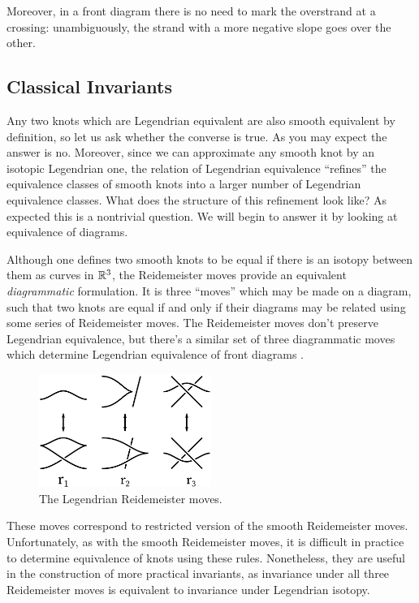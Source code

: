 Moreover, in a front diagram there is no need to mark the overstrand at a crossing: unambiguously, the strand with a more negative slope goes over the other.

\subsection{Classical Invariants}

Any two knots which are Legendrian equivalent are also smooth equivalent by definition, so let us ask whether the converse is true.
As you may expect the answer is no. Moreover, since we can approximate any smooth knot by an isotopic Legendrian one, the relation of Legendrian equivalence ``refines'' the equivalence classes of smooth knots into a larger number of Legendrian equivalence classes. What does the structure of this refinement look like? As expected this is a nontrivial question. We will begin to answer it by looking at equivalence of diagrams.

Although one defines two smooth knots to be equal if there is an isotopy between them as curves in $\mathbb{R}^3$, the Reidemeister moves provide an equivalent \emph{diagrammatic} formulation.
It is three ``moves'' which may be made on a diagram, such that two knots are equal if and only if their diagrams may be related using some series of Reidemeister moves.
The Reidemeister moves don't preserve Legendrian equivalence, but there's a similar set of three diagrammatic moves which determine Legendrian equivalence of front diagrams  \cite{swiatkowski}.

\begin{figure}[ht]
    \centering
    \includegraphics[width=0.5\textwidth]{images/redeimeister.pdf}
    \caption{The Legendrian Reidemeister moves.}%
    \label{fig:redemeister}
\end{figure}

These moves correspond to restricted version of the smooth Reidemeister moves.
Unfortunately, as with the smooth Reidemeister moves, it is difficult in practice to determine equivalence of knots using these rules. Nonetheless, they are useful in the construction of more practical invariants, as invariance under all three Reidemeister moves is equivalent to invariance under Legendrian isotopy.

